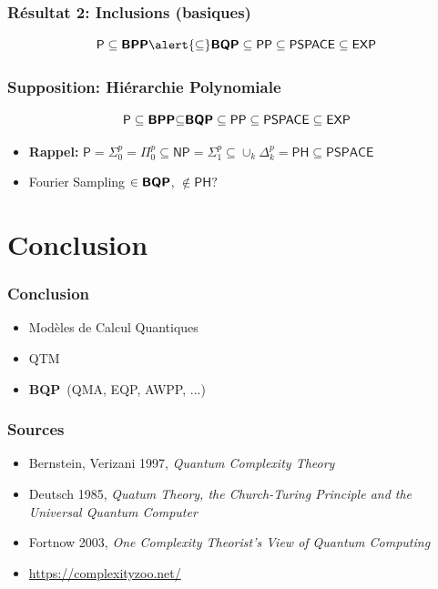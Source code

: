 \documentclass{beamer}
\newcommand{\bqp}{\textsf{\textbf{BQP}}}
\newcommand{\bpp}{\textsf{\textbf{BPP}}}
\begin{document}
\begin{frame}
  \frametitle{R\'esultat 2: Inclusions (basiques)}

  \[\textsf{P} \subseteq \bpp \alert{\subseteq} \bqp \subseteq \textsf{PP} \subseteq \textsf{PSPACE} \subseteq \textsf{EXP} \]
\end{frame}

\begin{frame}
  \frametitle{Supposition: Hi\'erarchie Polynomiale}

  \[\textsf{P} \subseteq \bpp {\subseteq} \bqp \subseteq \textsf{PP} \subseteq \textsf{PSPACE} \subseteq \textsf{EXP} \]
  \begin{itemize}
    \item \textbf{Rappel:} $\textsf{P} = \Sigma_0^p = \Pi_0^p \subseteq \textsf{NP} = \Sigma_1^p \subseteq \cup_k \Delta_k^p = \textsf{PH} \subseteq \textsf{PSPACE}$ \pause
    \item Fourier Sampling $\in \bqp$, $\notin \textsf{PH}?$
  \end{itemize}
\end{frame}

\section{Conclusion}

\begin{frame}
  \frametitle{Conclusion}

  \begin{itemize}
    \item Mod\`eles de Calcul Quantiques
    \item QTM
    \item \bqp \ (\textsf{QMA}, \textsf{EQP}, \textsf{AWPP}, ...)
  \end{itemize}
\end{frame}

\begin{frame}
  \frametitle{Sources}

  \begin{itemize}
    \item Bernstein, Verizani 1997, \emph{Quantum Complexity Theory}
    \item Deutsch 1985, \emph{Quatum Theory, the Church-Turing Principle and the Universal Quantum Computer}
    \item Fortnow 2003, \emph{One Complexity Theorist's View of Quantum Computing}
    \item \url{https://complexityzoo.net/}
  \end{itemize}
\end{frame}
\end{document}
